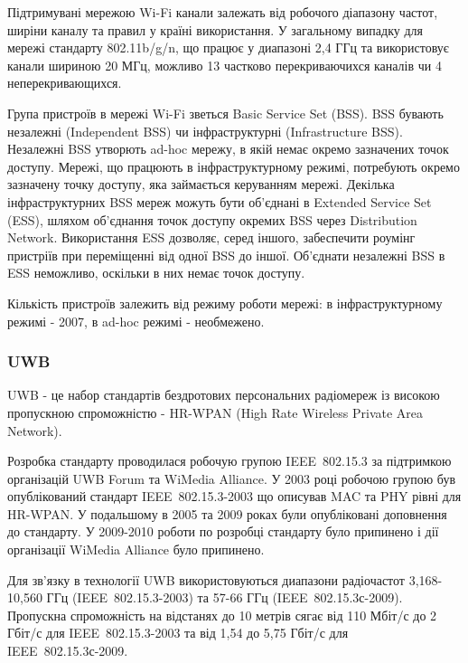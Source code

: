 \documentclass[a4paper,ukrainian,utf8,nocolumnsxix,floatsection,equationsection]{eskdtext}
\renewcommand\paragraph{\subsubsection}
\newcommand{\todoi}[1]{\todo[inline]{#1}}
\newcommand{\engtxt}[1]{\foreignlanguage{english}{#1}}
\begin{document}
Підтримувані мережою Wi-Fi канали залежать від робочого діапазону частот, ширіни каналу та правил у країні використання. У загальному випадку для мережі стандарту 802.11b/g/n, що працює у диапазоні 2,4 ГГц та використовує канали шириною 20 МГц, можливо 13 частково перекриваючихся каналів чи 4 неперекривающихся. 

\todoi{image channels}

Група пристроїв в мережі Wi-Fi зветься \engtxt{Basic Service Set} (BSS). BSS бувають незалежні (\engtxt{Independent BSS}) чи інфраструктурні (\engtxt{Infrastructure BSS}). Незалежні BSS утворють ad-hoc мережу, в якій немає окремо зазначених точок доступу. Мережі, що працюють в інфраструктурному режимі, потребують окремо зазначену точку доступу, яка займається керуванням мережі. Декілька інфраструктурних BSS мереж можуть бути об’єднані в \engtxt{Extended Service Set} (ESS), шляхом об’єднання точок доступу окремих BSS через \engtxt{Distribution Network}. Використання ESS дозволяє, серед іншого, забеспечити роумінг пристріїв при переміщенні від одної BSS до іншої. Об’єднати незалежні BSS в ESS неможливо, оскільки в них немає точок доступу.

Кількість пристроїв залежить від режиму роботи мережі: в інфраструктурному режимі - 2007, в ad-hoc режимі - необмежено.


\paragraph{UWB} %
\label{par:uwb}

UWB - це набор стандартів бездротових персональних радіомереж із високою пропускною спроможністю - HR-WPAN (High Rate Wireless Private Area Network).

Розробка стандарту проводилася робочую групою IEEE~802.15.3 за підтримкою організацій UWB Forum та WiMedia Alliance. У 2003 році робочою групою був опублікований стандарт IEEE~802.15.3-2003 що описував MAC та PHY рівні для HR-WPAN. У подальшому в 2005 та 2009 роках були опубліковані доповнення до стандарту. У 2009-2010 роботи по розробці стандарту було припинено і дії організації WiMedia Alliance було припинено.

Для зв’язку в технології UWB використовуються диапазони радіочастот 3,168-10,560 ГГц (IEEE~802.15.3-2003)  та 57-66 ГГц (IEEE~802.15.3с-2009). Пропускна спроможність на відстанях до 10 метрів сягає від 110 Мбіт/с до 2 Гбіт/с для IEEE~802.15.3-2003 та від 1,54 до 5,75 Гбіт/с для IEEE~802.15.3с-2009.
\end{document}
